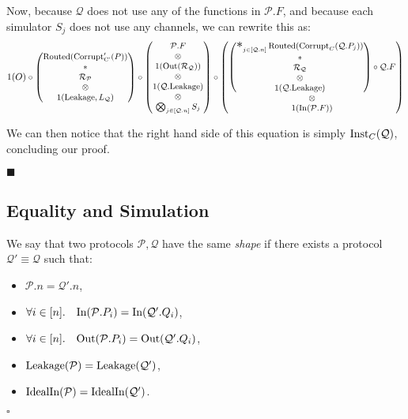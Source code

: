 \begin{theorem}
Now, because $\mathcal{Q}$ does not use any of the functions
in $\mathcal{P}.F$, and because each simulator $S_j$
does not use any channels, we can rewrite this as:
$$
\small
1(O) \circ
\begin{pmatrix}
  \tx{Routed}(\tx{Corrupt}'_{\tx{C'}}(P))\cr
  *\cr
  \mathcal{R}_{\mathcal{P}}\cr
  \otimes\cr
  1(\tx{Leakage}, L_{\mathcal{Q}})
\end{pmatrix}
\circ
\begin{pmatrix}
  \mathcal{P}.F\cr
  \otimes\cr
  1(\tx{Out}(\mathcal{R}_{\mathcal{Q}}))\cr
  \otimes\cr
  1(\mathcal{Q}.\tx{Leakage})\cr
  \otimes\cr
  \bigotimes_{j \in [\mathcal{Q}.n]} S_j
\end{pmatrix}
\circ
\begin{pmatrix}
\begin{pmatrix}
\bigast_{j \in [\mathcal{Q}.n]}
  \tx{Routed}(\tx{Corrupt}_C(\mathcal{Q}.P_j))
  \cr
  *\cr
  \mathcal{R}_{\mathcal{Q}}\cr
  \otimes\cr
  1(\mathcal{Q}.\tx{Leakage})
\end{pmatrix}
\circ
  \mathcal{Q}.F
  \cr
  \otimes\cr
  1(\tx{In}(\mathcal{P}.F))
\end{pmatrix}
$$

We can then notice that the right hand side of this equation
is simply $\text{Inst}_C(\mathcal{Q})$,
concluding our proof.

$\blacksquare$

\end{theorem}

\subsection{Equality and Simulation}

\begin{definition}[Shape]
  \label{def:shape}
  We say that two protocols $\mathcal{P}, \mathcal{Q}$ have the same \emph{shape}
  if there exists a protocol $\mathcal{Q}' \equiv \mathcal{Q}$ such that:
  \begin{itemize}
    \item $\mathcal{P}.n = \mathcal{Q}'.n$,
    \item $\forall i \in [n].\quad \text{In}(\mathcal{P}.P_i) = \text{In}(\mathcal{Q}'.Q_i)$,
    \item $\forall i \in [n].\quad \text{Out}(\mathcal{P}.P_i) = \text{Out}(\mathcal{Q}'.Q_i)$,
    \item $\text{Leakage}(\mathcal{P}) = \text{Leakage}(\mathcal{Q}')$,
    \item $\text{IdealIn}(\mathcal{P}) = \text{IdealIn}(\mathcal{Q}')$.
  \end{itemize}

  $\square$
\end{definition}

